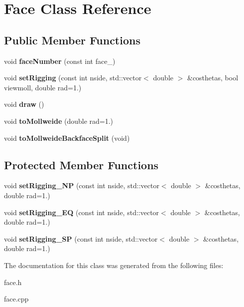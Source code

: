 \hypertarget{classFace}{
\section{Face Class Reference}
\label{classFace}
}
\subsection*{Public Member Functions}
\begin{DoxyCompactItemize}
\item 
\hypertarget{classFace_af6f4a722058a9d8b3b29db2810b663ec}{
void {\bfseries faceNumber} (const int face\_\-)}
\label{classFace_af6f4a722058a9d8b3b29db2810b663ec}

\item 
\hypertarget{classFace_a02855490ccfdd0f111c0c6c59a13238d}{
void {\bfseries setRigging} (const int nside, std::vector$<$ double $>$ \&costhetas, bool viewmoll, double rad=1.)}
\label{classFace_a02855490ccfdd0f111c0c6c59a13238d}

\item 
\hypertarget{classFace_a9a98ccd5ee73039e27830b1afffe667f}{
void {\bfseries draw} ()}
\label{classFace_a9a98ccd5ee73039e27830b1afffe667f}

\item 
\hypertarget{classFace_a33d4f4d556c0de0ee80d0a847d209ca4}{
void {\bfseries toMollweide} (double rad=1.)}
\label{classFace_a33d4f4d556c0de0ee80d0a847d209ca4}

\item 
\hypertarget{classFace_a617454c87d14ff9491bb8b2f4f27e440}{
void {\bfseries toMollweideBackfaceSplit} (void)}
\label{classFace_a617454c87d14ff9491bb8b2f4f27e440}

\end{DoxyCompactItemize}
\subsection*{Protected Member Functions}
\begin{DoxyCompactItemize}
\item 
\hypertarget{classFace_a67f72d9b23b0667051d628266ec7ffef}{
void {\bfseries setRigging\_\-NP} (const int nside, std::vector$<$ double $>$ \&costhetas, double rad=1.)}
\label{classFace_a67f72d9b23b0667051d628266ec7ffef}

\item 
\hypertarget{classFace_a00f7ca2cb8c4c27a176fa7b142d235e5}{
void {\bfseries setRigging\_\-EQ} (const int nside, std::vector$<$ double $>$ \&costhetas, double rad=1.)}
\label{classFace_a00f7ca2cb8c4c27a176fa7b142d235e5}

\item 
\hypertarget{classFace_a200a02bc3081683f329b94f69005a563}{
void {\bfseries setRigging\_\-SP} (const int nside, std::vector$<$ double $>$ \&costhetas, double rad=1.)}
\label{classFace_a200a02bc3081683f329b94f69005a563}

\end{DoxyCompactItemize}


The documentation for this class was generated from the following files:\begin{DoxyCompactItemize}
\item 
face.h\item 
face.cpp\end{DoxyCompactItemize}
